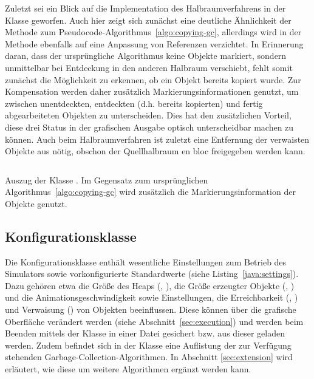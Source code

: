 Zuletzt sei ein Blick auf die Implementation des Halbraumverfahrens in der Klasse  geworfen.
Auch hier zeigt sich zunächst eine deutliche Ähnlichkeit der Methode  zum Pseudocode-Algorithmus~\ref{algo:copying-gc}, allerdings wird in der Methode  ebenfalls auf eine Anpassung von Referenzen verzichtet.
In Erinnerung daran, dass der ursprüngliche Algorithmus keine Objekte markiert, sondern unmittelbar bei Entdeckung in den anderen Halbraum verschiebt, fehlt somit zunächst die Möglichkeit zu erkennen, ob ein Objekt bereits kopiert wurde.
Zur Kompensation werden daher zusätzlich Markierungsinformationen genutzt, um zwischen unentdeckten, entdeckten (d.h. bereits kopierten) und fertig abgearbeiteten Objekten zu unterscheiden.
Dies hat den zusätzlichen Vorteil, diese drei Status in der grafischen Ausgabe optisch unterscheidbar machen zu können.
Auch beim Halbraumverfahren ist zuletzt eine Entfernung der verwaisten Objekte aus  nötig, obschon der Quellhalbraum en bloc freigegeben werden kann.

\begin{listing}[h]
	\inputminted[]{java}{code/Semispace-core.java}
	\caption[Auszug der Klasse ]{Auszug der Klasse . Im Gegensatz zum ursprünglichen Algorithmus~\ref{algo:copying-gc} wird zusätzlich die Markierungsinformation der Objekte genutzt.}
	\label{java:semispace-core}
\end{listing}

\subsection{Konfigurationsklasse }
\label{sub:settings}
Die Konfigurationsklasse  enthält wesentliche Einstellungen zum Betrieb des Simulators sowie vorkonfigurierte Standardwerte (siehe Listing~\ref{java:settings}).
Dazu gehören etwa die Größe des Heaps (, ), die Größe erzeugter Objekte (, ) und die Animationsgeschwindigkeit sowie Einstellungen, die Erreichbarkeit (, ) und Verwaisung () von Objekten beeinflussen.
Diese können über die grafische Oberfläche verändert werden (siehe Abschnitt~\ref{sec:execution}) und werden beim Beenden mittels der Klasse  in einer Datei  gesichert bzw. aus dieser geladen werden.
Zudem befindet sich in der Klasse  eine Auflistung der zur Verfügung stehenden Garbage-Collection-Algorithmen.
In Abschnitt \ref{sec:extension} wird erläutert, wie diese um weitere Algorithmen ergänzt werden kann.

